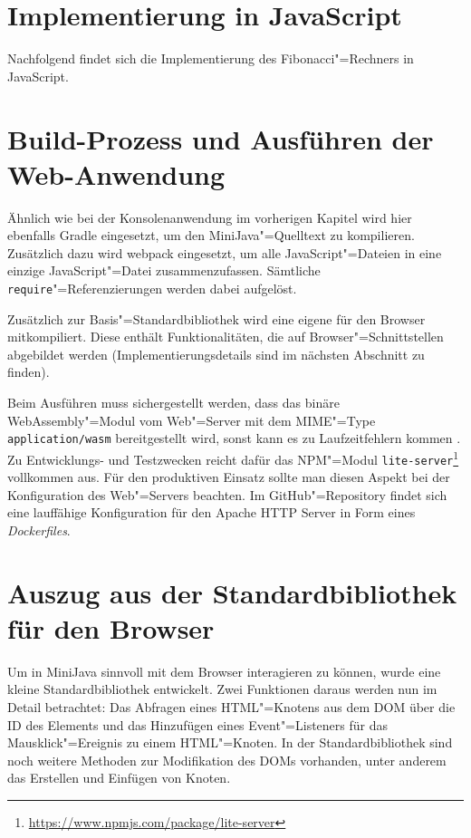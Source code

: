 \section{Implementierung in JavaScript}

Nachfolgend findet sich die Implementierung des Fibonacci"=Rechners in JavaScript.


\section{Build-Prozess und Ausführen der Web-Anwendung}

Ähnlich wie bei der Konsolenanwendung im vorherigen Kapitel wird hier ebenfalls Gradle eingesetzt, um den MiniJava"=Quelltext zu kompilieren. Zusätzlich dazu wird webpack \cite{Webpack} eingesetzt, um alle JavaScript"=Dateien in eine einzige JavaScript"=Datei zusammenzufassen. Sämtliche \lstinline{require}"=Referenzierungen werden dabei aufgelöst.

Zusätzlich zur Basis"=Standardbibliothek wird eine eigene für den Browser mitkompiliert. Diese enthält Funktionalitäten, die auf Browser"=Schnittstellen abgebildet werden (Implementierungsdetails sind im nächsten Abschnitt zu finden).

Beim Ausführen muss sichergestellt werden, dass das binäre WebAssembly"=Modul vom Web"=Server mit dem MIME"=Type \lstinline{application/wasm} bereitgestellt wird, sonst kann es zu Laufzeitfehlern kommen \cite{MDNWebAssembly}. Zu Entwicklungs- und Testzwecken reicht dafür das NPM"=Modul \lstinline{lite-server}\footnote{\url{https://www.npmjs.com/package/lite-server}} vollkommen aus. Für den produktiven Einsatz sollte man diesen Aspekt bei der Konfiguration des Web"=Servers beachten. Im GitHub"=Repository findet sich eine lauffähige Konfiguration für den Apache HTTP Server in Form eines \emph{Dockerfiles}.

\section{Auszug aus der Standardbibliothek für den Browser}

Um in MiniJava sinnvoll mit dem Browser interagieren zu können, wurde eine kleine Standardbibliothek entwickelt. Zwei Funktionen daraus werden nun im Detail betrachtet: Das Abfragen eines HTML"=Knotens aus dem DOM über die ID des Elements und das Hinzufügen eines Event"=Listeners für das Mausklick"=Ereignis zu einem HTML"=Knoten. In der Standardbibliothek sind noch weitere Methoden zur Modifikation des DOMs vorhanden, unter anderem das Erstellen und Einfügen von Knoten.

